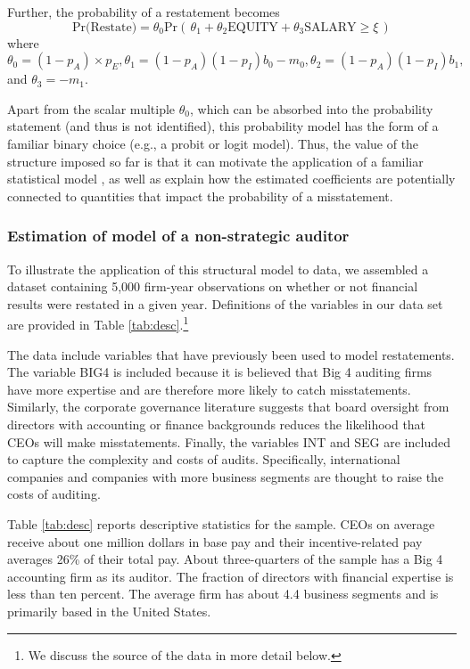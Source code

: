 Further, the probability of a restatement becomes
\begin{equation} \label{restate1}
\mbox{Pr(Restate)} = \theta_0 \mbox{Pr}\left(\, \theta_1 + \theta_2 \mbox{EQUITY} + \theta_3 \mbox{SALARY}  \ge \xi \,\right)
\end{equation}
where $\theta_0=(1-p_A) \times p_{E}, \theta_1 = (1 - p_A)(1 - p_I) b_0 - m_0, 
\theta_2 = (1 - p_A)(1 - p_I) b_1,$ and $\theta_3 = - m_1$. 

Apart from the scalar multiple $\theta_0$, which can be absorbed into the probability statement (and thus is not identified), this probability model has the form of  a familiar binary choice (e.g., a probit or logit model).
Thus, the value of the structure imposed so far is that it can motivate the application of a familiar statistical model \citep[as in]{Efendi:2007ja}, as well as explain how the estimated coefficients are potentially connected to quantities that impact the probability of a misstatement.

\subsubsection{Estimation of model of a non-strategic auditor}
To illustrate the application of this structural model to data, we assembled a dataset containing 5,000 firm-year observations on whether or not financial results were restated in a given year.
Definitions of the variables in our data set are provided in Table \ref{tab:desc}.\footnote{
We discuss the source of the data in more detail below.}

The data include variables that have previously been used to model restatements.
The variable BIG4 is included because it is believed that Big 4 auditing firms have more expertise and are therefore more likely to catch misstatements. 
Similarly, the corporate governance literature suggests that board oversight from directors with accounting or finance backgrounds reduces the likelihood that CEOs will make misstatements. 
Finally, the variables INT and SEG are included to capture the complexity and costs of audits. 
Specifically, international companies and companies with more business segments are thought to raise the costs of auditing. 

Table \ref{tab:desc} reports descriptive statistics for the sample. 
CEOs on average receive about one million dollars in base pay and their incentive-related pay averages 26\% of their total pay.
About three-quarters of the sample has a Big 4 accounting firm as its auditor. 
The fraction of directors with financial expertise is less than ten percent. 
The average firm has about 4.4 business segments and is primarily based in the United States.

